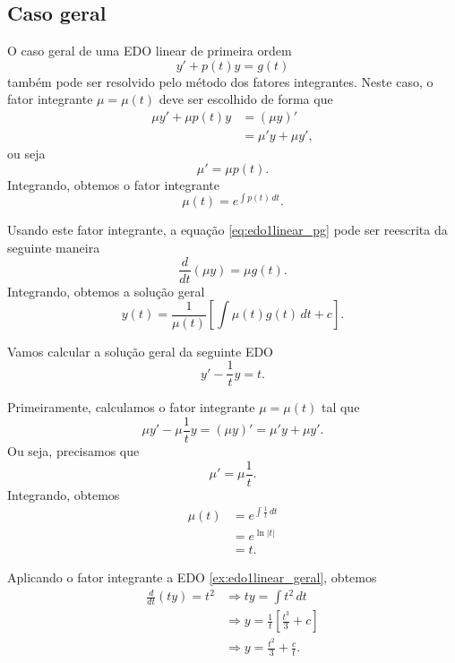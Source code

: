 \subsection{Caso geral}

O caso geral de uma EDO linear de primeira ordem
\begin{equation}\label{eq:edo1linear_pg}
  y' + p(t)y = g(t)
\end{equation}
também pode ser resolvido pelo método dos fatores integrantes. Neste caso, o fator integrante $\mu = \mu(t)$ deve ser escolhido de forma que
\begin{align}
  \mu y' + \mu p(t) y &= (\mu y)' \\
                      &= \mu' y + \mu y',
\end{align}
ou seja
\begin{equation}
  \mu' = \mu p(t).
\end{equation}
Integrando, obtemos o fator integrante
\begin{equation}
  \mu(t) = e^{\int p(t)\,dt}.
\end{equation}

Usando este fator integrante, a equação \eqref{eq:edo1linear_pg} pode ser reescrita da seguinte maneira
\begin{equation}
  \frac{d}{dt}\left(\mu y\right) = \mu g(t).
\end{equation}
Integrando, obtemos a solução geral
\begin{equation}
  y(t) = \frac{1}{\mu(t)}\left[\int \mu(t) g(t)\,dt + c\right].
\end{equation}

\begin{ex}
  Vamos calcular a solução geral da seguinte EDO
  \begin{equation}\label{ex:edo1linear_geral}
    y' - \frac{1}{t}y = t.
  \end{equation}

  Primeiramente, calculamos o fator integrante $\mu = \mu(t)$ tal que
  \begin{equation}
    \mu y' - \mu \frac{1}{t} y = (\mu y)' = \mu'y + \mu y'.
  \end{equation}
  Ou seja, precisamos que
  \begin{equation}
    \mu' = \mu \frac{1}{t}.
  \end{equation}
  Integrando, obtemos
  \begin{align}
    \mu(t) &= e^{\int \frac{1}{t}\,dt} \\
           &= e^{\ln|t|} \\
           &= t.
  \end{align}

  Aplicando o fator integrante a EDO \eqref{ex:edo1linear_geral}, obtemos
  \begin{align}
    \frac{d}{dt}\left(t y\right) = t^2 &\Rightarrow ty = \int t^2\,dt \\
                                       &\Rightarrow y = \frac{1}{t}\left[\frac{t^3}{3} + c\right] \\
                                       &\Rightarrow y = \frac{t^2}{3} + \frac{c}{t}.
  \end{align}
\end{ex}

